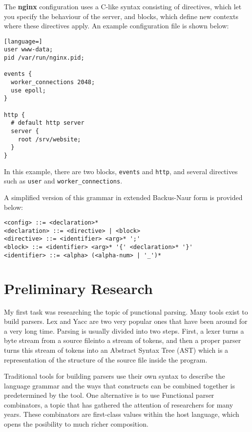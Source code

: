 \documentclass[]{article}
\begin{document}
The \textbf{nginx} configuration uses a C-like syntax consisting of
directives, which let you specify the behaviour of the server, and
blocks, which define new contexts where these directives apply. An
example configuration file is shown below:

\begin{lstlisting}[language=]
user www-data;
pid /var/run/nginx.pid;

events {
  worker_connections 2048;
  use epoll;
}

http {
  # default http server
  server {
    root /srv/website;
  }
}
\end{lstlisting}

In this example, there are two blocks, \texttt{events} and
\texttt{http}, and several directives such as \texttt{user} and
\texttt{worker\_connections}.

A simplified version of this grammar in extended Backus-Naur form is
provided below:

\begin{verbatim}
<config> ::= <declaration>*
<declaration> ::= <directive> | <block>
<directive> ::= <identifier> <arg>* ';'
<block> ::= <identifier> <arg>* '{' <declaration>* '}'
<identifier> ::= <alpha> (<alpha-num> | '_')*
\end{verbatim}

\section{Preliminary Research}\label{preliminary-research}

My first task was researching the topic of punctional parsing.
Many tools exist to build parsers. Lex and Yacc are two very popular
ones that have been around for a very long time. Parsing is usually
divided into two steps. First, a lexer turns a byte stream from a source fileinto a
stream of tokens, and then a proper parser turns this stream of tokens
into an Abstract Syntax Tree (AST) which is a representation of the
structure of the source file inside the program.

Traditional tools for building parsers use their own syntax to describe
the language grammar and the ways that constructs can be combined together
is predetermined by the tool. One alternative is to use Functional parser
combinators, a topic that has gathered the attention of researchers for
many years. These combinators are first-class values within the host language,
which opens the posibility to much richer composition.
\end{document}
